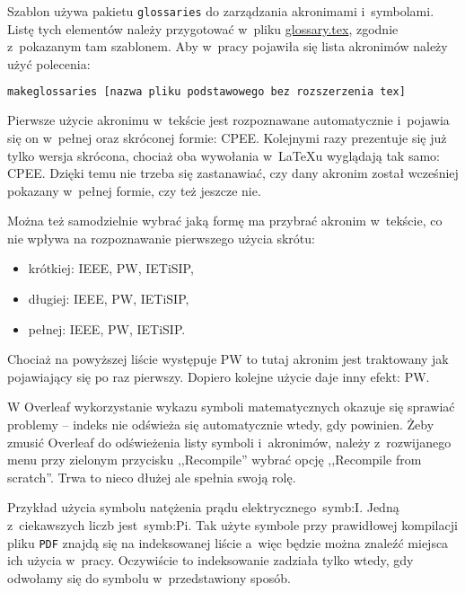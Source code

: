 Szablon używa pakietu \texttt{glossaries} do zarządzania akronimami i~symbolami. Listę tych elementów należy przygotować w~pliku \href{./glossary.tex}{glossary.tex}, zgodnie z~pokazanym tam szablonem. Aby w~pracy pojawiła się lista akronimów należy użyć polecenia:

\begin{lstlisting}[language=bash,
    numbers=none,
    caption=Wygenerowanie listy skrótów i~symboli,
    label={lst:gloss}]
makeglossaries [nazwa pliku podstawowego bez rozszerzenia tex]
\end{lstlisting}

Pierwsze użycie akronimu w~tekście jest rozpoznawane automatycznie i~pojawia się on w~pełnej oraz skróconej formie: \gls{CPEE}. Kolejnymi razy prezentuje się już tylko wersja skrócona, chociaż oba wywołania w~\LaTeX{u} wyglądają tak samo: \gls{CPEE}. Dzięki temu nie trzeba się zastanawiać, czy dany akronim został wcześniej pokazany w~pełnej formie, czy też jeszcze nie.

Można też samodzielnie wybrać jaką formę ma przybrać akronim w~tekście, co nie wpływa na rozpoznawanie pierwszego użycia skrótu:
\begin{itemize}
    \item krótkiej: \acrshort{IEEE}, \acrshort{PW}, \acrshort{IETiSIP},
    \item długiej: \acrlong{IEEE}, \acrlong{PW}, \acrlong{IETiSIP},
    \item pełnej: \acrfull{IEEE}, \acrfull{PW}, \acrfull{IETiSIP}.
\end{itemize}

Chociaż na powyższej liście występuje \gls{PW} to tutaj akronim jest traktowany jak pojawiający się po raz pierwszy. Dopiero kolejne użycie daje inny efekt: \gls{PW}.

W Overleaf wykorzystanie wykazu symboli matematycznych okazuje się sprawiać problemy -- indeks nie odświeża się automatycznie wtedy, gdy powinien. Żeby zmusić Overleaf do odświeżenia listy symboli i~akronimów, należy z~rozwijanego menu przy zielonym przycisku ,,Recompile'' wybrać opcję ,,Recompile from scratch''. Trwa to nieco dłużej ale spełnia swoją rolę.

Przykład użycia symbolu natężenia prądu elektrycznego~\gls{symb:I}. Jedną z~ciekawszych liczb jest~\gls{symb:Pi}. Tak użyte symbole przy prawidłowej kompilacji pliku \texttt{PDF} znajdą się na indeksowanej liście a~więc będzie można znaleźć miejsca ich użycia w~pracy. Oczywiście to indeksowanie zadziała tylko wtedy, gdy odwołamy się do symbolu w~przedstawiony sposób.

